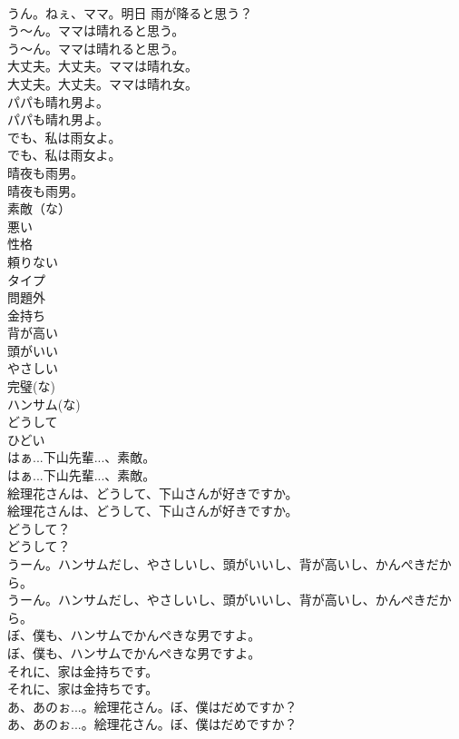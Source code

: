 \documentclass[8pt]{extreport}
\begin{document}
\begin{CJK}{UTF8}{min}
\\	うん。ねぇ、ママ。明日 雨が降ると思う？ 
\\	う～ん。ママは晴れると思う。	
\\	う～ん。ママは晴れると思う。 
\\	大丈夫。大丈夫。ママは晴れ女。	
\\	大丈夫。大丈夫。ママは晴れ女。 
\\	パパも晴れ男よ。	
\\	パパも晴れ男よ。 
\\	でも、私は雨女よ。	
\\	でも、私は雨女よ。 
\\	晴夜も雨男。	
\\	晴夜も雨男。 
\\	素敵（な）
\\	悪い
\\	性格
\\	頼りない
\\	タイプ
\\	問題外
\\	金持ち
\\	背が高い
\\	頭がいい
\\	やさしい
\\	完璧(な)
\\	ハンサム(な)
\\	どうして
\\	ひどい
\\	はぁ...下山先輩...、素敵。	
\\	はぁ...下山先輩...、素敵。 
\\	絵理花さんは、どうして、下山さんが好きですか。	
\\	絵理花さんは、どうして、下山さんが好きですか。 
\\	どうして？	
\\	どうして？ 
\\	うーん。ハンサムだし、やさしいし、頭がいいし、背が高いし、かんぺきだから。	
\\	うーん。ハンサムだし、やさしいし、頭がいいし、背が高いし、かんぺきだから。 
\\	ぼ、僕も、ハンサムでかんぺきな男ですよ。	
\\	ぼ、僕も、ハンサムでかんぺきな男ですよ。 
\\	それに、家は金持ちです。	
\\	それに、家は金持ちです。 
\\	あ、あのぉ...。絵理花さん。ぼ、僕はだめですか？	
\\	あ、あのぉ...。絵理花さん。ぼ、僕はだめですか？ 

\end{CJK}
\end{document}
